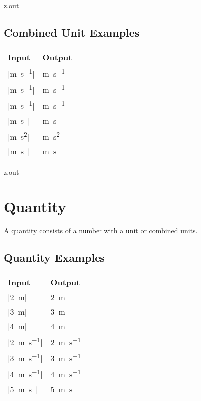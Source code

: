 \begin{VerbatimOut}{z.out}

\subsection{Combined Unit Examples}

\begin{inlinetable}
  \begin{tabular}{@{}ll@{}}
    \toprule
    \textbf{Input}& \textbf{Output}\\
    \midrule
    |\unit{\meter\per\second}|&   \unit{\meter\per\second}\\
    |\unit{\m\per\s}|&            \unit{\m\per\s}\\
    |\unit{m.s^{-1}}|&            \unit{m.s^{-1}}\\
    |\unit{m.s\NE1}|&             \unit{m.s\NE1}\\[6pt]
    |\unit{m.s^2}|&               \unit{m.s^2}\\
    |\unit{m.s\PE2}|&             \unit{m.s\PE2}\\
    \bottomrule
  \end{tabular}
\end{inlinetable}
\end{VerbatimOut}

\MyIO


\begin{VerbatimOut}{z.out}


\section{Quantity}

A quantity consists of a number with a unit or combined units.

\subsection{Quantity Examples}

\begin{inlinetable}
  \begin{tabular}{@{}ll@{}}
    \toprule
    \textbf{Input}& \textbf{Output}\\
    \midrule
    |\qty{2}{\meter}|&            \qty{2}{\meter}\\
    |\qty{3}{\m}|&                \qty{3}{\m}\\
    |\qty{4}{m}|&                 \qty{4}{m}\\[6pt]
    |\qty{2}{\meter\per\second}|& \qty{2}{\meter\per\second}\\
    |\qty{3}{\m\per\s}|&          \qty{3}{\m\per\s}\\
    |\qty{4}{m.s^{-1}}|&          \qty{4}{m.s^{-1}}\\
    |\qty{5}{m.s\NE1}|&           \qty{5}{m.s\NE1}\\
    \bottomrule
  \end{tabular}
\end{inlinetable}
\end{VerbatimOut}

